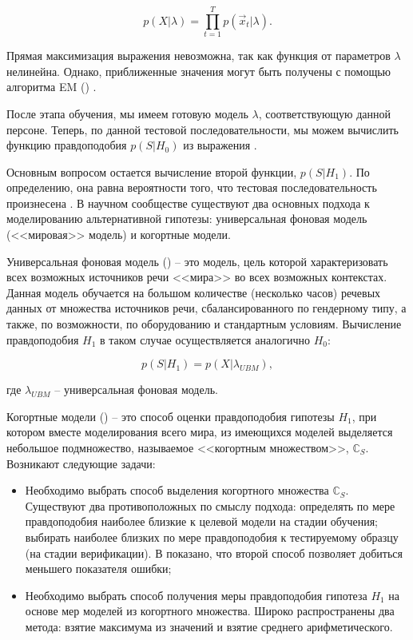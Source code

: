 \begin{equation}
\label{eq:likelihood}
p(X | \lambda) = \prod_{t=1}^T p(\vec x_t | \lambda).
\end{equation}

\label{sec:analytic:em}
Прямая максимизация выражения  невозможна, так как функция от параметров $\lambda$ нелинейна. Однако, приближенные значения могут быть получены с помощью алгоритма EM () \cite{Dempster77EM}.

После этапа обучения, мы имеем готовую модель $\lambda$, соответствующую данной персоне. Теперь, по данной тестовой последовательности, мы можем вычислить функцию правдоподобия $p(S|H_0)$ из выражения .

Основным вопросом остается вычисление второй функции, $p(S|H_1)$. По определению, она равна вероятности того, что тестовая последовательность произнесена . В научном сообществе существуют два основных подхода к моделированию альтернативной гипотезы: универсальная фоновая модель (<<мировая>> модель) и когортные модели.

\label{sec:analytic:ubm}
Универсальная фоновая модель () -- это модель, цель которой характеризовать всех возможных источников речи <<мира>> во всех возможных контекстах. Данная модель обучается на большом количестве (несколько часов) речевых данных от множества источников речи, сбалансированного по гендерному типу, а также, по возможности, по оборудованию и стандартным условиям. Вычисление правдоподобия $H_1$ в таком случае осуществляется аналогично $H_0$:

\begin{equation}
\label{eq:likelihood_ubm}
p(S|H_1) = p(X|\lambda_{UBM}),
\end{equation}

\noindent где $\lambda_{UBM}$ -- универсальная фоновая модель.

Когортные модели () -- это способ оценки правдоподобия гипотезы $H_1$, при котором вместе моделирования всего мира, из имеющихся моделей выделяется небольшое подмножество, называемое <<когортным множеством>>, $\mathbb{C}_S$. Возникают следующие задачи:
\begin{itemize}
\item Необходимо выбрать способ выделения когортного множества $\mathbb{C}_S$. Существуют два противоположных по смыслу подхода: определять по мере правдоподобия наиболее близкие к целевой модели на стадии обучения; выбирать наиболее близких по мере правдоподобия к тестируемому образцу (на стадии верификации). В \cite{Kinnunen04cohort} показано, что второй способ позволяет добиться меньшего показателя ошибки;
\item Необходимо выбрать способ получения меры правдоподобия гипотеза $H_1$ на основе мер моделей из когортного множества. Широко распространены два метода: взятие максимума из значений и взятие среднего арифметического.
\end{itemize}

